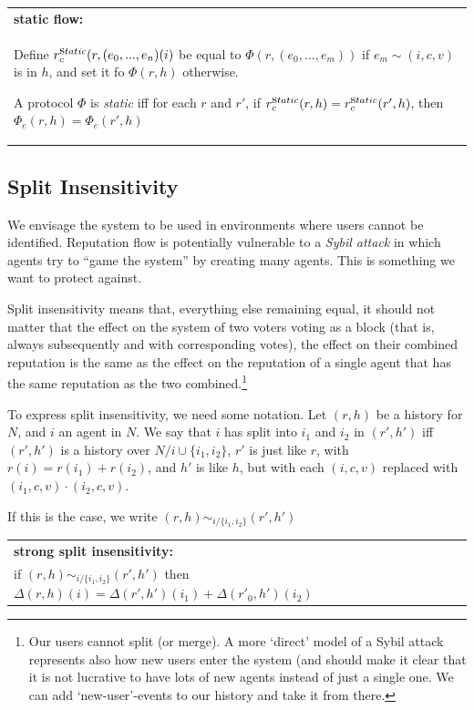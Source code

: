 \documentclass{article}
\newcommand{\flow}{\Phi}
\newenvironment{condition}[1]
	{
	\begin{center}
	   \begin{tabular}{|p{.9\textwidth}|}
		\hline \medskip
		{\bf #1:}\\
	}
	{
		\medskip \\\hline
	\end{tabular}
	\end{center}
	}
\begin{document}
\begin{condition}{static flow}

Define $r^{\mbox static}_{c}(r, (e_0, ... , e_n)(i)$ be equal to $\flow(r, (e_0, ..., e_m))$ if $e_m \sim (i, c, v)$ is in $h$, and set it fo $\flow(r, h)$ otherwise. 

A protocol $\flow$ is {\em static} iff for each $r$ and $r'$, if $r^{\mbox static}_{c}(r, h) = r^{\mbox static}_{c}(r', h)$, then $\Phi_{e}(r, h) = \Phi_{e}(r', h)$
\end{condition}

\subsection{Split Insensitivity}

We envisage the system to be used in environments where users cannot be identified.
Reputation flow is potentially vulnerable to a {\em Sybil attack} in which agents try to ``game the system'' by creating many agents. This is something we want to protect against. 

Split insensitivity means that, everything else remaining equal, it should not matter that the effect on the system of two voters voting as a block (that is, always subsequently and with corresponding votes), the effect on their combined reputation is the same as the effect on the reputation of a single agent that has the same reputation as the two combined.\footnote{Our users cannot split (or merge). A more `direct' model of a Sybil attack represents also how new users enter the system (and should make it clear that it is not lucrative to have lots of new agents instead of just a single one. We can add `new-user'-events to our history and take it from there.}

To express split insensitivity, we need some notation. Let $(r, h)$ be a history for $N$, and $i$ an agent in $N$. We say that $i$ has split into $i_1$ and $i_2$ in $(r', h')$  iff $(r', h')$ is a history over $N / {i} \cup \{i_1, i_2\}$, $r'$ is just like $r$, with $r(i) = r(i_1) + r(i_2)$, and $h'$ is like $h$, but with each $(i, c, v)$ replaced with $(i_1, c, v) \cdot (i_2, c, v)$. 

If this is the case, we write $(r, h) \sim_{i/\{i_1, i_2\}} (r', h')$

\begin{condition}{strong split insensitivity} 
if $(r, h) \sim_{i/\{i_1, i_2\}} (r', h')$ then $\Delta(r, h)(i) = \Delta(r', h')(i_1) + \Delta(r'_0, h')(i_2)$
\end{condition}
\end{document}
